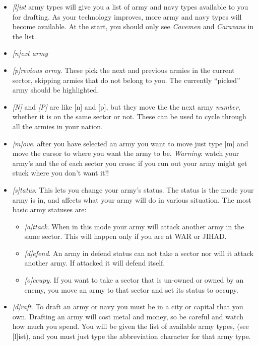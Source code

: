 \begin{itemize}

\item
\emph{[l]ist} army types will give you a list of army and navy types
available to you for drafting.  As your technology improves, more army
and navy types will become available.  At the start, you should only
see \emph{Cavemen} and \emph{Caravans} in the list.

\item
\emph{[n]ext army}
\item
\emph{[p]revious army}.  These pick the next and previous armies in the
current sector, skipping armies that do not belong to you.  The
currently ``picked'' army should be highlighted.

\item
\emph{[N]} and \emph{[P]} are like [n] and [p], but they move the the next
army \emph{number}, whether it is on the same sector or not.  These
can be used to cycle through all the armies in your nation.

\item
\emph{[m]ove}. after you have selected an army you want to move just type
[m] and move the cursor to where you want the army to be.
\emph{Warning}: watch your army's  and the
 of each sector you cross: if you run out your army
might get stuck where you don't want it!!

\item
\emph{[s]tatus}.  This lets you change your army's status.  The status is
the mode your army is in, and affects what your army will do in
various situation.  The most basic army statuses are:

\begin{itemize}
\item
\emph{[a]ttack}. When in this mode your army will attack another
army in the same sector.  This will happen only if you are at WAR
or JIHAD.

\item
\emph{[d]efend}. An army in defend status can not take a sector nor
will it attack another army.  If attacked it will defend itself.

\item
\emph{[o]ccupy}. If you want to take a sector that is un-owned or owned
by an enemy, you move an army to that sector and set its status to
occupy.
\end{itemize}

\item
\emph{[d]raft}.  To draft an army or navy you must be in a city or
capital that you own.  Drafting an army will cost metal and money, so
be careful and watch how much you spend.  You will be given the list
of available army types, (see [l]ist), and you must just type the
abbreviation character for that army type.

\end{itemize}

